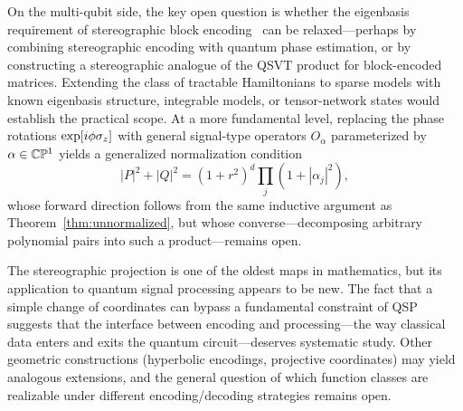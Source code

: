 On the multi-qubit side, the key open question is whether
the eigenbasis requirement of stereographic block
encoding~\cite{KharaziLeytonOrtega2026b} can be
relaxed---perhaps by combining stereographic encoding with
quantum phase estimation, or by constructing a stereographic
analogue of the QSVT product for block-encoded matrices.
Extending the class of tractable Hamiltonians to sparse models
with known eigenbasis structure, integrable models, or
tensor-network states would establish the practical scope.  At a more fundamental level,
replacing the phase rotations $\exp[i\phi\sigma_z]$ with general
signal-type operators $O_\alpha$ parameterized by
$\alpha \in \mathbb{C}\mathbb{P}^1$ yields a generalized normalization
condition
\begin{equation}
	|P|^2 + |Q|^2 = (1{+}r^2)^d \textstyle\prod_j(1{+}|\alpha_j|^2),
	\label{eq:generalized-norm}
\end{equation}
whose forward direction follows from the same inductive
argument as Theorem~\ref{thm:unnormalized}, but whose
converse---decomposing arbitrary polynomial pairs into such a
product---remains open.

The stereographic projection is one of the oldest maps in
mathematics, but its application to quantum signal processing
appears to be new.  The fact that a simple change of
coordinates can bypass a fundamental constraint of QSP suggests
that the interface between encoding and processing---the way
classical data enters and exits the quantum circuit---deserves
systematic study.  Other geometric constructions (hyperbolic
encodings, projective coordinates) may yield analogous
extensions, and the general question of which function classes
are realizable under different encoding/decoding strategies
remains open.
